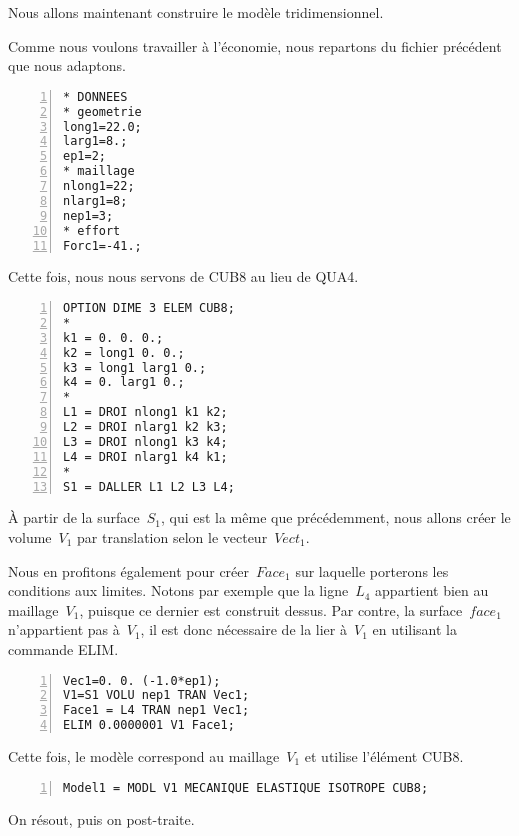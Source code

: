 Nous allons maintenant construire le modèle tridimensionnel.

Comme nous voulons travailler à l'économie, nous repartons du fichier précédent que nous adaptons.

\scriptsize
\begin{Verbatim}[numbers=left,numbersep=3pt]
* DONNEES
* geometrie
long1=22.0;
larg1=8.;
ep1=2;
* maillage
nlong1=22;
nlarg1=8;
nep1=3;
* effort
Forc1=-41.;
\end{Verbatim}
\normalsize

\medskip
Cette fois, nous nous servons de CUB8 au lieu de QUA4.

\scriptsize
\begin{Verbatim}[numbers=left,numbersep=3pt,firstnumber=last]
OPTION DIME 3 ELEM CUB8;
*
k1 = 0. 0. 0.;
k2 = long1 0. 0.;
k3 = long1 larg1 0.;
k4 = 0. larg1 0.;
*
L1 = DROI nlong1 k1 k2;
L2 = DROI nlarg1 k2 k3;
L3 = DROI nlong1 k3 k4;
L4 = DROI nlarg1 k4 k1;
*
S1 = DALLER L1 L2 L3 L4;
\end{Verbatim}
\normalsize

\medskip
À partir de la surface~$S_1$, qui est la même que précédemment, nous allons créer le volume~$V_1$ par translation selon le vecteur~$Vect_1$.

Nous en profitons également pour créer~$Face_1$ sur laquelle porterons les conditions aux limites. Notons par exemple que la ligne~$L_4$ appartient bien au maillage~$V_1$, puisque ce dernier est construit dessus. Par contre, la surface~$face_1$ n'appartient pas à~$V_1$, il est donc nécessaire de la lier à~$V_1$ en utilisant la commande ELIM.

\scriptsize
\begin{Verbatim}[numbers=left,numbersep=3pt,firstnumber=last]
Vec1=0. 0. (-1.0*ep1);
V1=S1 VOLU nep1 TRAN Vec1;
Face1 = L4 TRAN nep1 Vec1;
ELIM 0.0000001 V1 Face1;
\end{Verbatim}
\normalsize

\medskip
Cette fois, le modèle correspond au maillage~$V_1$ et utilise l'élément CUB8.

\scriptsize
\begin{Verbatim}[numbers=left,numbersep=3pt,firstnumber=last]
Model1 = MODL V1 MECANIQUE ELASTIQUE ISOTROPE CUB8;
\end{Verbatim}
\normalsize

\medskip
On résout, puis on post-traite.

